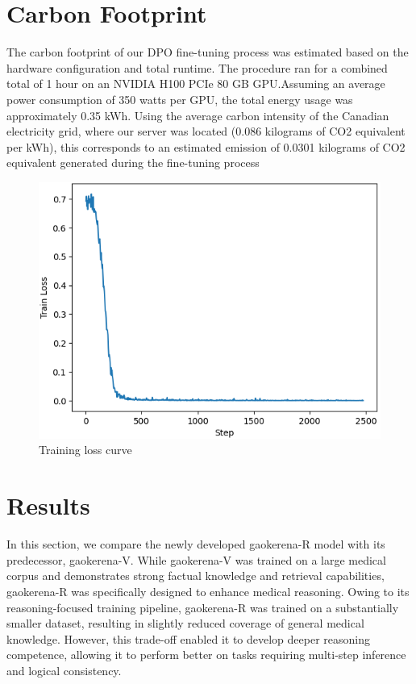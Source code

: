 \documentclass[conference]{IEEEtran}
\begin{document}
          \section{Carbon Footprint}
The carbon footprint of our DPO fine-tuning process was estimated based on the hardware configuration and total runtime. The procedure ran for a combined total of 1 hour on an NVIDIA H100 PCIe 80 GB GPU.Assuming an average power consumption of 350 watts per GPU, the total energy usage was approximately 0.35 kWh. Using the average carbon intensity of the Canadian electricity grid, where our server was located (0.086 kilograms of CO2 equivalent per kWh), this corresponds to an estimated emission of 0.0301 kilograms of CO2 equivalent generated during the fine-tuning process

\begin{figure}[h]
    \centering
    \includegraphics[width=0.8\linewidth]{fig3.png}
    \caption{Training loss curve}
    \label{fig3}
\end{figure}
          \section{Results}
In this section, we compare the newly developed gaokerena-R model with its predecessor, gaokerena-V. While gaokerena-V was trained on a large medical corpus and demonstrates strong factual knowledge and retrieval capabilities, gaokerena-R was specifically designed to enhance medical reasoning. Owing to its reasoning-focused training pipeline, gaokerena-R was trained on a substantially smaller dataset, resulting in slightly reduced coverage of general medical knowledge. However, this trade-off enabled it to develop deeper reasoning competence, allowing it to perform better on tasks requiring multi-step inference and logical consistency.  
\end{document}
